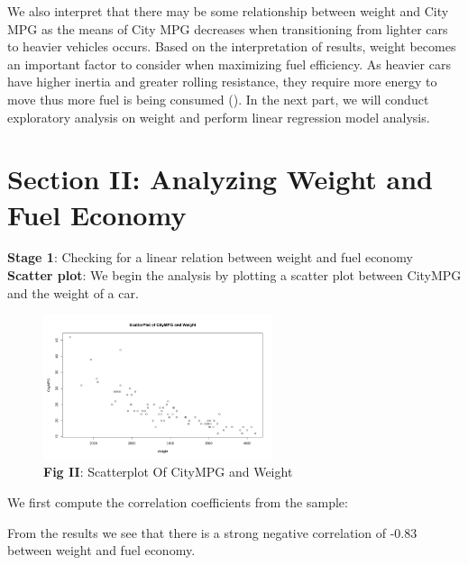 \documentclass[12pt]{article}
\begin{document}
We also interpret that there may be some relationship between weight and City MPG as the means of City MPG decreases when transitioning from lighter cars to heavier vehicles occurs. Based on the interpretation of results, weight becomes an important factor to consider when maximizing fuel efficiency. As heavier cars have higher inertia and greater rolling resistance, they require more energy to move thus more fuel is being consumed (\cite{NRC}). In the next part, we will conduct exploratory analysis on weight and perform linear regression model analysis.
\section{Section II: Analyzing Weight and Fuel Economy}
\textbf{Stage 1}: Checking for a linear relation between weight and fuel economy \newline
\textbf{Scatter plot}: We begin the analysis by plotting a scatter plot between CityMPG and the weight of a car.
\begin{figure}[!htb]
	\begin{center}	\includegraphics[width=0.60\textwidth]{Scatterplot.png}
    \caption*{\textbf{Fig II}:{ Scatterplot Of CityMPG and Weight}}
	\end{center}
\end{figure}
We first compute the correlation coefficients from the sample: 

From the results we see that there is a strong negative correlation of -0.83 between weight and fuel economy. 
\end{document}
